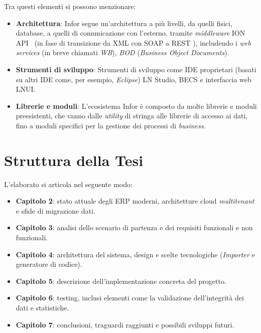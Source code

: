 Tra questi elementi si possono menzionare:
\begin{itemize}
    \item \textbf{Architettura}: Infor segue un'architettura a più livelli, da quelli fisici, database, a quelli di comunicazione con l'esterno.
    tramite \textit{middleware} ION API~\cite{inforION} (in fase di transizione da XML con SOAP a REST \cite{fieldingREST}), includendo i \textit{web services} (in breve chiamati \textit{WB}), \textit{BOD} (\textit{Business Object Documents}).
    \item \textbf{Strumenti di sviluppo}: Strumenti di sviluppo come IDE proprietari (basati su altri IDE come, per esempio, \textit{Eclipse})
    LN Studio, BECS e interfaccia web LNUI\@.
    \item \textbf{Librerie e moduli}: L'ecosistema Infor è composto da molte librerie e moduli preesistenti, che vanno dalle \textit{utility} di
    stringa alle librerie di accesso ai dati, fino a moduli specifici per la gestione dei processi di \textit{business}.
\end{itemize}

\section{Struttura della Tesi}\label{sec:struttura-della-tesi}
L'elaborato si articola nel seguente modo:
\begin{itemize}
    \item \textbf{Capitolo 2}: stato attuale degli ERP moderni, architetture cloud \textit{multitenant} e sfide di migrazione dati.
    \item \textbf{Capitolo 3}: analisi dello scenario di partenza e dei requisiti funzionali e non funzionali.
    \item \textbf{Capitolo 4}: architettura del sistema, design e scelte tecnologiche (\textit{Importer} e generatore di codice).
    \item \textbf{Capitolo 5}: descrizione dell'implementazione concreta del progetto.
    \item \textbf{Capitolo 6}: testing, inclusi elementi come la validazione dell'integrità dei dati e statistiche.
    \item \textbf{Capitolo 7}: conclusioni, traguardi raggiunti e possibili sviluppi futuri.
\end{itemize}
